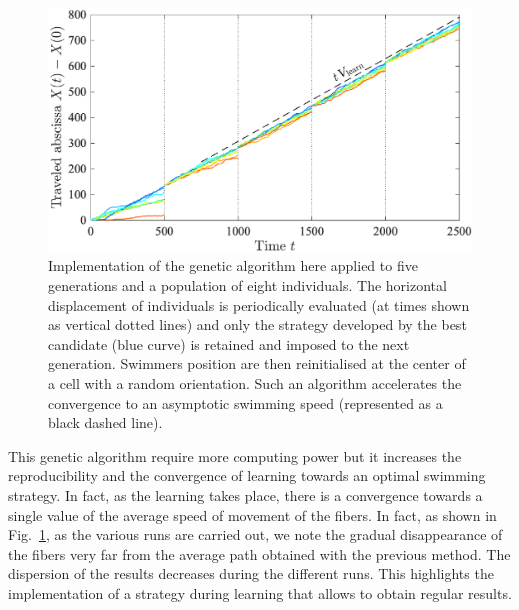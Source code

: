 \documentclass[aps,prl,preprint,groupedaddress]{revtex4-2}
\begin{document}
\begin{figure}[ht]
  \centerline{\includegraphics[width=\columnwidth]{genetic_learning}}
  \caption{\label{fig:genetic_learning} Implementation of the genetic algorithm here applied to five generations and a population of eight individuals. The horizontal displacement of individuals is periodically evaluated (at times shown as vertical dotted lines) and only the strategy developed by the best candidate (blue curve) is retained and imposed to the next generation. Swimmers position are then reinitialised at the center of a cell with a random orientation. Such an algorithm accelerates the convergence to an asymptotic swimming speed (represented as a black dashed line). }
\end{figure}

This genetic algorithm require more computing power but it increases the reproducibility and the convergence of learning towards an optimal swimming strategy. In fact, as the learning takes place, there is a convergence towards a single value of the average speed of movement of the fibers. In fact, as shown in Fig.~\ref{fig:genetic_learning}, as the various runs are carried out, we note the gradual disappearance of the fibers very far from the average path obtained with the previous method. The dispersion of the results decreases during the different runs. This highlights the implementation of a strategy during learning that allows to obtain regular results.
\end{document}
